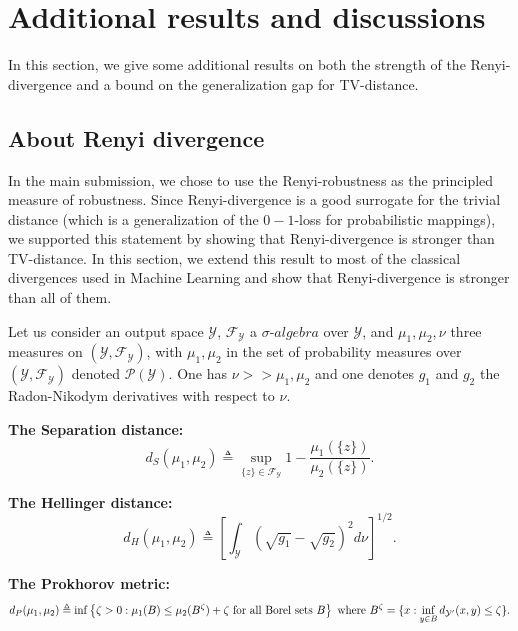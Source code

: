 \section{Additional results and discussions}
In this section, we give some additional results on both the strength of the Renyi-divergence and a bound on the generalization gap for TV-distance.

\subsection{About Renyi divergence}

In the main submission, we chose to use the Renyi-robustness as the principled measure of robustness. Since Renyi-divergence is a good surrogate for the trivial distance (which is a generalization of the $0-1$-loss for probabilistic mappings), we supported this statement by showing that Renyi-divergence is stronger than TV-distance.
In this section, we extend this result to most of the classical divergences used in Machine Learning and show that Renyi-divergence is stronger than all of them.   

Let us consider an output space $\mathcal{Y}$, $\mathcal{F}_{\mathcal{Y}}$ a $\sigma$-$ algebra$ over $\mathcal{Y}$, and $\mu_1,\mu_2,\nu$ three measures on $(\mathcal{Y},\mathcal{F}_{\mathcal{Y}})$, with $\mu_1,\mu_2$ in the set of probability measures over $(\mathcal{Y},\mathcal{F}_{\mathcal{Y}})$ denoted $\mathcal{P}(\mathcal{Y})$.
One has $\nu >> \mu_1,\mu_2$ and one denotes $g_1$ and $g_2$ the Radon-Nikodym derivatives with respect to $\nu$.

\textbf{The Separation distance:}
$$d_{S}(\mu_1,\mu_2) \triangleq \underset{\{z\} \in \mathcal{F}_{\mathcal{Y}}}{\sup}  1 - \frac{\mu_1(\{z\})}{\mu_2(\{z\})}. $$


\textbf{The Hellinger distance:} 
$$ d_{H}(\mu_1,\mu_2) \triangleq  \left[ \int_{\mathcal{Y}} \left(\sqrt{g_1} - \sqrt{g_2} \right)^{2} d \nu \right]^{1/2}.$$


\textbf{The Prokhorov metric:} 
$$d_{P}(\mu_1,\mu_2) \triangleq \inf\left\{ \zeta >0: \mu_1(B) \leq \mu_2(B^{\zeta}) + \zeta \textnormal{ for all Borel sets } B\right\}
\textnormal{ where } B^{\zeta} = \{x : \inf\limits_{y \in B} d_{\mathcal{Y'}}(x,y)\leq \zeta \}.$$


